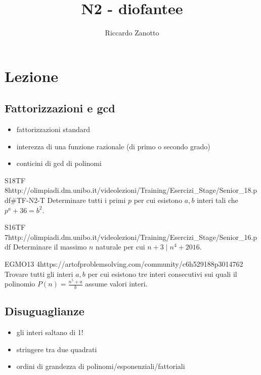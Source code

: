\documentclass[12pt]{article}
\author{Riccardo Zanotto}
\title{N2 - diofantee}
\begin{document}
\maketitle


\section{Lezione}

\subsection{Fattorizzazioni e gcd}
\begin{itemize}
    \item fattorizzazioni standard
    \item interezza di una funzione razionale (di primo o secondo grado)
    \item conticini di gcd di polinomi
\end{itemize}

\begin{esercizio}{S18TF 8}{http://olimpiadi.dm.unibo.it/videolezioni/Training/Esercizi_Stage/Senior_18.pdf\#TF-N2-T}
    Determinare tutti i primi $p$ per cui esistono $a,b$ interi tali che $p^a+36=b^2$.
\end{esercizio}

\begin{esercizio}{S16TF 7}{http://olimpiadi.dm.unibo.it/videolezioni/Training/Esercizi_Stage/Senior_16.pdf}
    Determinare il massimo $n$ naturale per cui $n+3\mid n^4+2016$.
\end{esercizio}

\begin{esercizio}{EGMO13 4}{https://artofproblemsolving.com/community/c6h529188p3014762}
    Trovare tutti gli interi $a,b$ per cui esistono tre interi consecutivi sui quali il polinomio $P(n)=\frac{n^5+a}{b}$ assume valori interi.
\end{esercizio}


\subsection{Disuguaglianze}
\begin{itemize}
    \item gli interi saltano di 1!
    \item stringere tra due quadrati
    \item ordini di grandezza di polinomi/esponenziali/fattoriali
\end{itemize}
\end{document}
